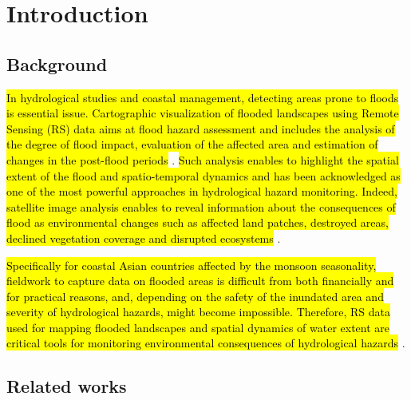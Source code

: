 \documentclass[water,article,submit,pdftex,moreauthors]{Definitions/mdpi}
\begin{document}
\section{Introduction}

\subsection{Background}
\hl{In hydrological studies and coastal management, detecting areas prone to floods is essential issue. Cartographic visualization of flooded landscapes using Remote Sensing (RS) data aims at flood hazard assessment and includes the analysis of the degree of flood impact, evaluation of the affected area and estimation of changes in the post-flood periods} \cite{su142114145,w15152802,su142316270}. \hl{Such analysis enables to highlight the spatial extent of the flood and spatio-temporal dynamics and has been acknowledged as one of the most powerful approaches in hydrological hazard monitoring. Indeed, satellite image analysis enables to reveal information about the consequences of flood as environmental changes such as affected land patches, destroyed areas, declined vegetation coverage and disrupted ecosystems} \cite{ijgi12110465,rs15102561}. 

\hl{Specifically for coastal Asian countries affected by the monsoon seasonality, fieldwork to capture data on flooded areas is difficult from both financially and for practical reasons, and, depending on the safety of the inundated area and severity of hydrological hazards, might become impossible. Therefore, RS data used for mapping flooded landscapes and spatial dynamics of water extent are critical tools for monitoring environmental consequences of hydrological hazards} \cite{YASEEN2024101665,GHALEHTEIMOURI2023}. 

\subsection{Related works}
\end{document}
